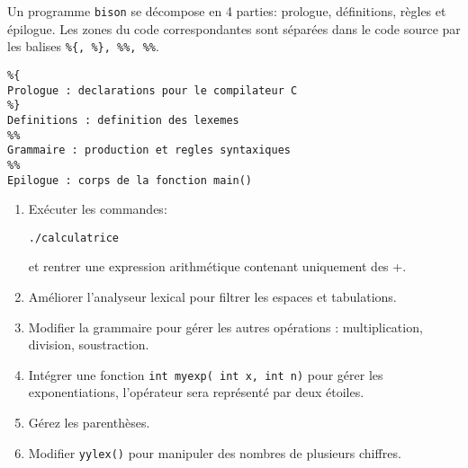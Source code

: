 \documentclass[a4paper,10pt, oneside]{article}
\begin{document}
Un programme \texttt{bison} se décompose en 4 parties:
prologue, définitions, règles et épilogue. Les zones du code
correspondantes sont séparées dans le code source par les balises
\texttt{\%\{, \%\}, \%\%, \%\%}.

\begin{lstlisting}
%{
Prologue : declarations pour le compilateur C
%}
Definitions : definition des lexemes 
%%
Grammaire : production et regles syntaxiques
%%
Epilogue : corps de la fonction main()
\end{lstlisting}


\begin{enumerate}

Le main du programme est réduit à sa plus simple expression : un appel
de l'analyseur syntaxique yyparse() qui utilise implicitement la
variable yylval et l'analyseur lexical yylex(), une fonction qui
renvoie la valeur du lexème (token) courant dont l'attribut est
transmis par la variable yylval. Les erreurs de syntaxes provoque
l'appel de la fonction yyerror(). Ci-dessous, un exemple d'analyseur
lexical rudimentaire.

\begin{lstlisting}
 int yylex( ) {
    int car ;
    car = getchar() ;
    if ( car == EOF ) return 0 ;
        if ( isdigit(car) ) {
            yylval = car - '0';
            return NB;
          }
    switch ( car ) {
      case '+' : return PLUS;
      case '\n': return FIN;
    }
    
  }
\end{lstlisting}

\item  Exécuter les commandes:

\begin{verbatim}
./calculatrice
\end{verbatim}

  et rentrer une expression arithmétique contenant uniquement des +.
  
\item Améliorer l’analyseur lexical pour filtrer les espaces et tabulations.
\item Modifier la grammaire pour gérer les autres opérations :
  multiplication, division, soustraction.
\item Intégrer une fonction \texttt{int myexp( int x, int n)} pour
  gérer les exponentiations, l’opérateur sera représenté par deux
  étoiles.
\item Gérez les parenthèses.
\item Modifier \texttt{yylex()} pour manipuler des nombres de
  plusieurs chiffres.
\end{enumerate}
\end{document}
